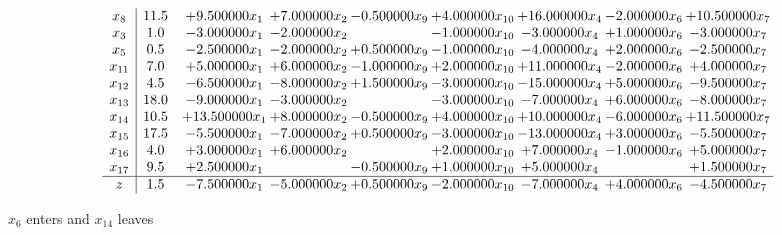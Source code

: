 \documentclass[10pt]{article}
\begin{document}
 \[\begin{array}{c| c c@{\hskip 2pt} c@{\hskip 2pt} c@{\hskip 2pt} c@{\hskip 2pt} c@{\hskip 2pt} c@{\hskip 2pt} c@{\hskip 2pt} }
 x_{8}   &  11.5 & + 9.500000 x_{1} & + 7.000000 x_{2} & -0.500000 x_{9} & + 4.000000 x_{10} & + 16.000000 x_{4} & -2.000000 x_{6} & + 10.500000 x_{7}\\
 x_{3}   &  1.0 & -3.000000 x_{1} & -2.000000 x_{2} &   & -1.000000 x_{10} & -3.000000 x_{4} & + 1.000000 x_{6} & -3.000000 x_{7}\\
 x_{5}   &  0.5 & -2.500000 x_{1} & -2.000000 x_{2} & + 0.500000 x_{9} & -1.000000 x_{10} & -4.000000 x_{4} & + 2.000000 x_{6} & -2.500000 x_{7}\\
 x_{11}   &  7.0 & + 5.000000 x_{1} & + 6.000000 x_{2} & -1.000000 x_{9} & + 2.000000 x_{10} & + 11.000000 x_{4} & -2.000000 x_{6} & + 4.000000 x_{7}\\
 x_{12}   &  4.5 & -6.500000 x_{1} & -8.000000 x_{2} & + 1.500000 x_{9} & -3.000000 x_{10} & -15.000000 x_{4} & + 5.000000 x_{6} & -9.500000 x_{7}\\
 x_{13}   &  18.0 & -9.000000 x_{1} & -3.000000 x_{2} &   & -3.000000 x_{10} & -7.000000 x_{4} & + 6.000000 x_{6} & -8.000000 x_{7}\\
 x_{14}   &  10.5 & + 13.500000 x_{1} & + 8.000000 x_{2} & -0.500000 x_{9} & + 4.000000 x_{10} & + 10.000000 x_{4} & -6.000000 x_{6} & + 11.500000 x_{7}\\
 x_{15}   &  17.5 & -5.500000 x_{1} & -7.000000 x_{2} & + 0.500000 x_{9} & -3.000000 x_{10} & -13.000000 x_{4} & + 3.000000 x_{6} & -5.500000 x_{7}\\
 x_{16}   &  4.0 & + 3.000000 x_{1} & + 6.000000 x_{2} &   & + 2.000000 x_{10} & + 7.000000 x_{4} & -1.000000 x_{6} & + 5.000000 x_{7}\\
 x_{17}   &  9.5 & + 2.500000 x_{1} &   & -0.500000 x_{9} & + 1.000000 x_{10} & + 5.000000 x_{4} &   & + 1.500000 x_{7}\\
\hline
z    &  1.5 & -7.500000 x_{1} & -5.000000 x_{2} & + 0.500000 x_{9} & -2.000000 x_{10} & -7.000000 x_{4} & + 4.000000 x_{6} & -4.500000 x_{7}\\
\end{array}\]


 $ x_{6} $ enters and $ x_{14} $ leaves 
\end{document}

